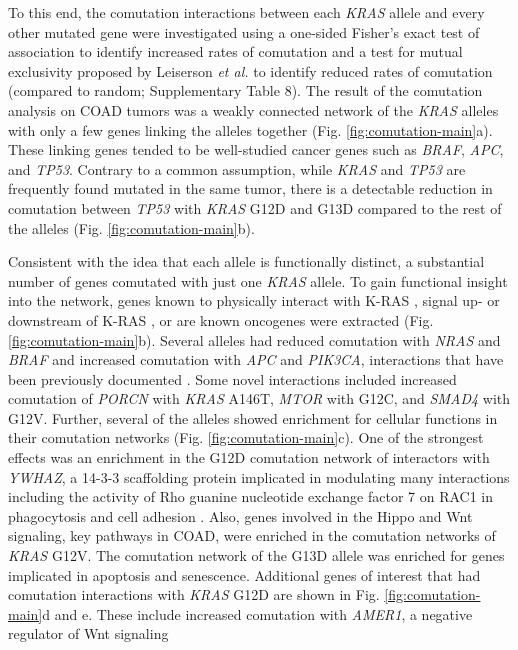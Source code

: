 \documentclass[english, 10pt, letterpaper]{article}
\newcommand{\KRAS}{\emph{KRAS}}
\newcommand{\kras}{K-RAS}
\begin{document}
To this end, the comutation interactions between each \KRAS{} allele and every other mutated gene were investigated using a one-sided Fisher's exact test of association to identify increased rates of comutation and a test for mutual exclusivity proposed by Leiserson \emph{et al.} \cite{Leiserson2016} to identify reduced rates of comutation (compared to random; Supplementary Table 8).
The result of the comutation analysis on COAD tumors was a weakly connected network of the \KRAS{} alleles with only a few genes linking the alleles together (Fig. \ref{fig:comutation-main}a).
These linking genes tended to be well-studied cancer genes such as \emph{BRAF}, \emph{APC}, and \emph{TP53}.
Contrary to a common assumption, while \KRAS{} and \emph{TP53} are frequently found mutated in the same tumor, there is a detectable reduction in comutation between \emph{TP53} with \KRAS{} G12D and G13D compared to the rest of the alleles (Fig. \ref{fig:comutation-main}b).

Consistent with the idea that each allele is functionally distinct, a substantial number of genes comutated with just one \KRAS{} allele.
To gain functional insight into the network, genes known to physically interact with \kras{} \cite{Kovalski2019}, signal up- or downstream of \kras{} \cite{Kanehisa2017, Kanehisa2016KEGGAnnotation.}, or are known oncogenes \cite{Bamford2004TheWebsite., Sondka2018} were extracted (Fig. \ref{fig:comutation-main}b).
Several alleles had reduced comutation with \emph{NRAS} and \emph{BRAF} and increased comutation with \emph{APC} and \emph{PIK3CA}, interactions that have been previously documented \cite{Sensi2006MutuallyMelanoma., Jauhri2017, Seth2009ConcomitantCancer., Cisowski2016, Janssen2006, Sakai2018, Kennedy2011, Wang2013, Green2015, Yeang2008CombinatorialCancer., CancerGenomeAtlasNetwork2012}. 
Some novel interactions included increased comutation of \emph{PORCN} with \KRAS{} A146T, \emph{MTOR} with G12C, and \emph{SMAD4} with G12V.
Further, several of the alleles showed enrichment for cellular functions in their comutation networks (Fig. \ref{fig:comutation-main}c).
One of the strongest effects was an enrichment in the G12D comutation network of interactors with \emph{YWHAZ}, a 14-3-3 scaffolding protein implicated in modulating many interactions including the activity of Rho guanine nucleotide exchange factor 7 on RAC1 in phagocytosis and cell adhesion \cite{Angrand2006TransgenicSignaling.}.
Also, genes involved in the Hippo and Wnt signaling, key pathways in COAD, were enriched in the comutation networks of \KRAS{} G12V.
The comutation network of the G13D allele was enriched for genes implicated in apoptosis and senescence.
Additional genes of interest that had comutation interactions with \KRAS{} G12D are shown in Fig. \ref{fig:comutation-main}d and e.
These include increased comutation with \emph{AMER1}, a negative regulator of Wnt signaling \cite{Grohmann2007AMER1Membrane., Tanneberger2011StructuralAmer1.}
\end{document}
